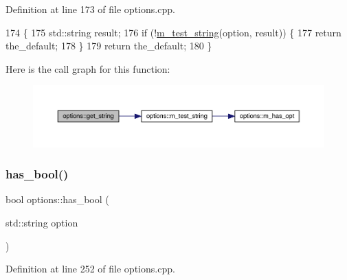 Definition at line 173 of file options.\+cpp.


\begin{DoxyCode}
174 \{
175   std::string result;
176   \textcolor{keywordflow}{if} (!\hyperlink{classoptions_a8286a8617eec86a3d4cf678bd17739ba}{m\_test\_string}(option, result)) \{
177     \textcolor{keywordflow}{return} the\_default;
178   \}  
179   \textcolor{keywordflow}{return} the\_default;
180 \}
\end{DoxyCode}
Here is the call graph for this function\+:\nopagebreak
\begin{figure}[H]
\begin{center}
\leavevmode
\includegraphics[width=350pt]{classoptions_ae03327a8846e4acb3986b5a6d79b3790_cgraph}
\end{center}
\end{figure}
\mbox{\label{classoptions_aafb1d2a7ccde0b1bf786230ba4080ecd}} 
\subsubsection{\texorpdfstring{has\+\_\+bool()}{has\_bool()}}
{\footnotesize\ttfamily bool options\+::has\+\_\+bool (\begin{DoxyParamCaption}\item[{std\+::string}]{option }\end{DoxyParamCaption})}



Definition at line 252 of file options.\+cpp.


